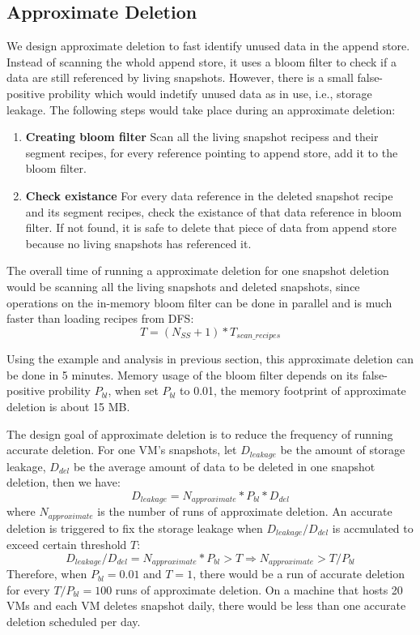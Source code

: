 \subsection{Approximate Deletion}
We design approximate deletion to fast identify unused data in the append store.
Instead of scanning the whold append store, it uses a bloom filter to check 
if a data are still referenced by living snapshots. However, there is a small false-positive probility which
would indetify unused data as in use, i.e., storage leakage.
The following steps would take place during an approximate deletion:

\begin{enumerate}
\item {\bf Creating bloom filter} Scan all the living snapshot recipess and their segment recipes,
for every reference pointing to append store, add it to the bloom filter.
\item {\bf Check existance} For every data reference in the deleted snapshot recipe and its segment recipes,
check the existance of that data reference in bloom filter. If not found, it is safe to delete that piece of data from append store
because no living snapshots has referenced it.
\end{enumerate}

The overall time of running a approximate deletion for one snapshot deletion would be scanning
all the living snapshots and deleted snapshots, since operations on the in-memory bloom filter can be done in
parallel and is much faster than loading recipes from DFS:
\begin{equation}
T = (N_{SS} + 1) * T_{scan\_recipes}
\end{equation}
 
Using the example and analysis in previous section, this approximate deletion can be done in 5 minutes. 
Memory usage of the bloom filter depends on its false-positive probility $P_{bl}$,
when set $P_{bl}$ to 0.01, the memory footprint of approximate deletion is about 15 MB.

The design goal of approximate deletion is to reduce the frequency of running accurate deletion.
For one VM's snapshots, let $D_{leakage}$ be the amount of storage leakage, $D_{del}$ be the average amount of data
to be deleted in one snapshot deletion, 
then we have:
\begin{equation}
D_{leakage} = N_{approximate} * P_{bl} * D_{del}
\end{equation}
where $N_{approximate}$ is the number of runs of approximate deletion. 
An accurate deletion is triggered to fix the storage leakage
when $D_{leakage}/D_{del}$ is accmulated to exceed certain threshold $T$:
\begin{equation}
D_{leakage} / D_{del} = N_{approximate} * P_{bl} > T \Rightarrow N_{approximate} > T/P_{bl}
\end{equation}
Therefore, when $P_{bl} = 0.01$ and $T=1$, 
there would be a run of accurate deletion for every $T/P_{bl} = 100$ runs of approximate deletion.
On a machine that hosts 20 VMs and each VM deletes snapshot daily, there would be less than
one accurate deletion scheduled per day.

